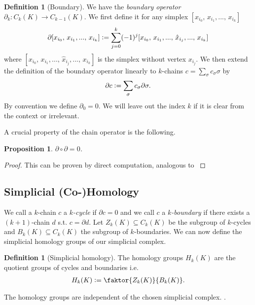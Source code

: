 \documentclass[12pt,a4paper]{article}
\numberwithin{equation}{subsection}
\numberwithin{lemma}{subsection}
\newtheorem{proposition}[lemma]{Proposition}
\theoremstyle{definition}
\newtheorem{definition}[lemma]{Definition}
\begin{document}
\begin{definition}[Boundary]
    We have the 
    \textit{boundary operator} $\partial_k: C_k(K) \rightarrow C_{k-1}(K)$.
    We first define it
    for any simplex $[x_{i_0},\, x_{i_1},...,\, x_{i_k}]$ 
    \begin{align*}
        \partial[x_{i_0},\, x_{i_1},...,\, x_{i_k}] \vcentcolon=
        \sum\limits_{j=0}^k (-1)^j [x_{i_0},\, x_{i_1},...,\, 
        \hat{x}_{i_j},...,\, x_{i_k}]
    \end{align*}
    where $[x_{i_0},\, x_{i_1},...,\, \hat{x}_{i_j},...,\, x_{i_k}]$ is the
    simplex without vertex $x_{i_j}$. We then extend the definition
    of the boundary operator linearly to $k$-chains 
    $c = \sum_\sigma c_\sigma \sigma$ by
    \begin{align*}
        \partial c \vcentcolon= \sum\limits_\sigma c_\sigma \partial \sigma.
    \end{align*}
    By convention we define $\partial_0 = 0$. We will leave out the index $k$
    if it is clear from the context or irrelevant.
\end{definition}

A crucial property of the chain operator is the following.

\begin{proposition}
    $\partial \circ \partial = 0$.
\end{proposition}
\begin{proof}
    This can be proven by direct computation, analogous to 
    \cite[Chap.~4, Lemma~1.6]{topology_and_geometry}
\end{proof}

\subsection{Simplicial (Co-)Homology}

We call a $k$-chain $c$ a \textit{$k$-cycle} if $\partial c = 0$ and we call $c$ 
a \textit{$k$-boundary} if there exists a $(k+1)$-chain $d$ s.t. 
$c = \partial d$. Let $Z_k(K) \subseteq C_k(K)$ be the subgroup of $k$-cycles
and $B_k(K) \subseteq C_k(K)$ the subgroup of $k$-boundaries.
We can now define the simplicial homology groups of our simplicial complex.

\begin{definition}[Simplicial homology]
    The homology groups $H_k(K)$ are the quotient groups of 
    cycles and boundaries i.e.
    \begin{align*}
        H_k(K)\vcentcolon= \faktor{Z_k(K)}{B_k(K)}.
    \end{align*}
\end{definition}
\noindent The homology groups are independent of the chosen simplicial complex.
\cite[p.248]{topology_and_geometry}. 
\end{document}
